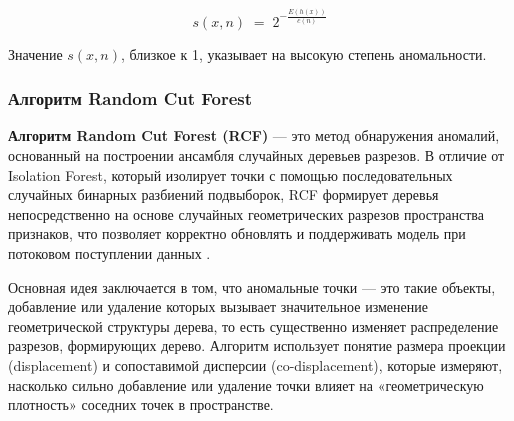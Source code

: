 \begin{equation}\label{s_x_n}
    s(x, n) \;=\; 2^{-\frac{E(h(x))}{c(n)}}
\end{equation}

Значение \(s(x,n)\), близкое к 1, указывает на высокую степень аномальности.

\subsubsection{Алгоритм Random Cut Forest}

\textbf{Алгоритм Random Cut Forest (RCF)} — это метод обнаружения аномалий, основанный на построении ансамбля случайных деревьев разрезов. В отличие от Isolation Forest, который изолирует точки с помощью последовательных случайных бинарных разбиений подвыборок, RCF формирует деревья непосредственно на основе случайных геометрических разрезов пространства признаков, что позволяет корректно обновлять и поддерживать модель при потоковом поступлении данных \cite{RCF}.

Основная идея заключается в том, что аномальные точки — это такие объекты, добавление или удаление которых вызывает значительное изменение геометрической структуры дерева, то есть существенно изменяет распределение разрезов, формирующих дерево. Алгоритм использует понятие размера проекции (displacement) и сопоставимой дисперсии (co-displacement), которые измеряют, насколько сильно добавление или удаление точки влияет на «геометрическую плотность» соседних точек в пространстве.

